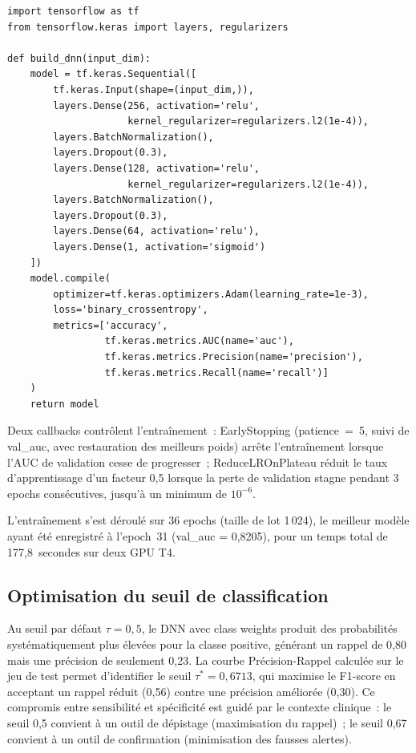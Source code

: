 \begin{lstlisting}[caption={Architecture du DNN (TensorFlow 2.19 / Keras 3)},
                   label=lst:dnn_arch]
import tensorflow as tf
from tensorflow.keras import layers, regularizers

def build_dnn(input_dim):
    model = tf.keras.Sequential([
        tf.keras.Input(shape=(input_dim,)),
        layers.Dense(256, activation='relu',
                     kernel_regularizer=regularizers.l2(1e-4)),
        layers.BatchNormalization(),
        layers.Dropout(0.3),
        layers.Dense(128, activation='relu',
                     kernel_regularizer=regularizers.l2(1e-4)),
        layers.BatchNormalization(),
        layers.Dropout(0.3),
        layers.Dense(64, activation='relu'),
        layers.Dense(1, activation='sigmoid')
    ])
    model.compile(
        optimizer=tf.keras.optimizers.Adam(learning_rate=1e-3),
        loss='binary_crossentropy',
        metrics=['accuracy',
                 tf.keras.metrics.AUC(name='auc'),
                 tf.keras.metrics.Precision(name='precision'),
                 tf.keras.metrics.Recall(name='recall')]
    )
    return model
\end{lstlisting}

Deux callbacks contrôlent l'entraînement~: EarlyStopping (patience~=~5, suivi de
val\_auc, avec restauration des meilleurs poids) arrête l'entraînement lorsque
l'AUC de validation cesse de progresser~; ReduceLROnPlateau réduit le taux
d'apprentissage d'un facteur 0,5 lorsque la perte de validation stagne pendant
3 epochs consécutives, jusqu'à un minimum de $10^{-6}$.

L'entraînement s'est déroulé sur 36 epochs (taille de lot 1\,024), le meilleur
modèle ayant été enregistré à l'epoch~31 (val\_auc = 0,8205), pour un temps
total de 177,8~secondes sur deux GPU T4.

\subsection{Optimisation du seuil de classification}

Au seuil par défaut $\tau = 0{,}5$, le DNN avec class weights produit des
probabilités systématiquement plus élevées pour la classe positive, générant
un rappel de 0,80 mais une précision de seulement 0,23. La courbe Précision-Rappel
calculée sur le jeu de test permet d'identifier le seuil $\tau^* = 0{,}6713$,
qui maximise le F1-score en acceptant un rappel réduit (0,56) contre une
précision améliorée (0,30). Ce compromis entre sensibilité et spécificité
est guidé par le contexte clinique~: le seuil 0,5 convient à un outil de
dépistage (maximisation du rappel)~; le seuil 0,67 convient à un outil de
confirmation (minimisation des fausses alertes).


